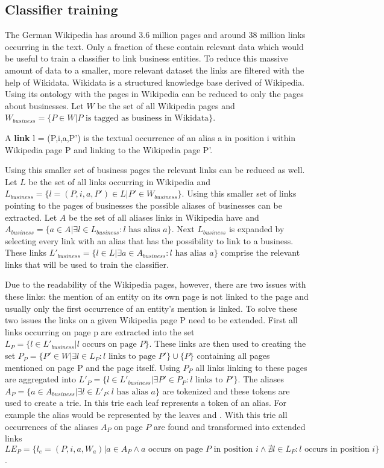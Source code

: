 \subsection{Classifier training}
The German Wikipedia has around 3.6 million pages and around 38 million links occurring in the text. Only a fraction of these contain relevant data which would be useful to train a classifier to link business entities. To reduce this massive amount of data to a smaller, more relevant dataset the links are filtered with the help of Wikidata. Wikidata is a structured knowledge base derived of Wikipedia. Using its ontology with the pages in Wikipedia can be reduced to only the pages about businesses. Let $W$ be the set of all Wikipedia pages and $W_{business} = \{ P \in W | P \text{ is tagged as business in Wikidata} \}$.
\begin{definition}
A \textbf{link} l = (P,i,a,P') is the textual occurrence of an alias a in position i within Wikipedia page P and linking to the Wikipedia page P'.
\label{link}
\end{definition}
Using this smaller set of business pages the relevant links can be reduced as well. Let $L$ be the set of all links occurring in Wikipedia and $L_{business} = \{ l = (P,i,a,P') \in L | P' \in W_{business} \}$. Using this smaller set of links pointing to the pages of businesses the possible aliases of businesses can be extracted. Let $A$ be the set of all aliases links in Wikipedia have and $A_{business} = \{ a \in A | \exists l \in L_{business}: l \text{ has alias } a \}$. Next $L_{business}$ is expanded by selecting every link with an alias that has the possibility to link to a business. These links $L'_{business} = \{ l \in L | \exists a \in A_{business}: l \text{ has alias } a \}$ comprise the relevant links that will be used to train the classifier.\par
Due to the readability of the Wikipedia pages, however, there are two issues with these links: the mention of an entity on its own page is not linked to the page and usually only the first occurrence of an entity's mention is linked. To solve these two issues the links on a given Wikipedia page P need to be extended. First all links occurring on page p are extracted into the set $L_P = \{ l \in L'_{business} | l \text{ occurs on page } P\}$. These links are then used to creating the set $P_P = \{ P' \in W | \exists l \in L_P: l \text{ links to page } P' \} \cup \{P\}$ containing all pages mentioned on page P and the page itself. Using $P_P$ all links linking to these pages are aggregated into $L'_P = \{ l \in L'_{business} | \exists P' \in P_P: l \text{ links to } P' \}$. The aliases $A_P = \{a \in A_{business} | \exists l \in L'_P: l \text{ has alias } a \}$ are tokenized and these tokens are used to create a trie. In this trie each leaf represents a token of an alias. For example the alias  would be represented by the leaves  and . With this trie all occurrences of the aliases $A_P$ on page $P$ are found and transformed into extended links $LE_P = \{ l_e = (P, i, a, W_a) | a \in A_P \land a \text{ occurs on page } P \text{ in position } i \land \nexists l \in L_P: l \text{ occurs in position } i \}$.
